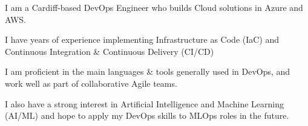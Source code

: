 
\begin{small}

  \vspace{0.25cm}

  I am a Cardiff-based DevOps Engineer who builds Cloud solutions in Azure and AWS.
  \vspace{0.25cm}

  I have years of experience implementing Infrastructure as Code (IaC) and Continuous Integration \& Continuous Delivery (CI/CD)
  \vspace{0.25cm}

  I am proficient in the main languages \& tools generally used in DevOps, and work well as part of collaborative Agile teams.
  \vspace{0.25cm}

  I also have a strong interest in Artificial Intelligence and Machine Learning (AI/ML) and hope to apply my DevOps skills to MLOps roles in the future. 

\end{small}
